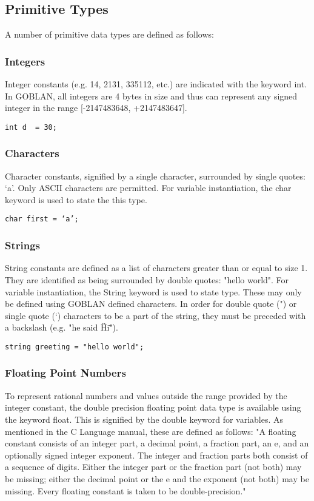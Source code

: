 \documentclass{article}
\begin{document}
\subsection{Primitive Types}
A number of primitive data types are defined as follows:
\subsubsection{Integers} %
Integer constants (e.g. 14, 2131, 335112, etc.) are indicated with the keyword int. In GOBLAN, all integers are 4 bytes in size and thus can represent any signed integer in the range [-2147483648, +2147483647]. 

\begin{lstlisting}
int d  = 30;
\end{lstlisting}

\subsubsection{Characters} %
Character constants, signified by a single character, surrounded by single quotes: ‘a’. Only ASCII characters are permitted. For variable instantiation, the char keyword is used to state the this type.

\begin{lstlisting}
char first = ‘a’;
\end{lstlisting}

\subsubsection{Strings}
String constants are defined as a list of characters greater than or equal to size 1. They are identified as being surrounded by double quotes: "hello world". For variable instantiation, the String keyword is used to state type. These may only be defined using GOBLAN defined characters. In order for double quote (") or single quote (‘) characters to be a part of the string, they must be preceded with a backslash (e.g. "he said \"Hi\" "). 

\begin{lstlisting}
string greeting = "hello world";
\end{lstlisting}

\subsubsection{Floating Point Numbers}
To represent rational numbers and values outside the range provided by the integer constant, the double precision floating point data type is available using the keyword float. This is signified by the double keyword for variables. As mentioned in the C Language manual, these are defined as follows: "A floating constant consists of an integer part, a decimal point, a fraction part, an e, and an optionally signed integer exponent. The integer and fraction parts both consist of a sequence of digits. Either the integer part or the fraction part (not both) may be missing; either the decimal point or the e and the exponent (not both) may be missing. Every floating constant is taken to be double-precision."
\end{document}
